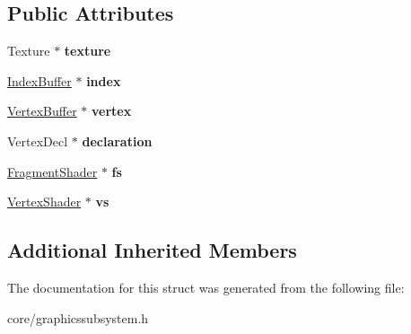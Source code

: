 \subsection*{Public Attributes}
\begin{DoxyCompactItemize}
\item 
\hypertarget{struct_tempest_1_1_graphics_subsystem_1_1_delete_event_a129f5428efc46d3b5469d69179b6882e}{Texture $\ast$ {\bfseries texture}}\label{struct_tempest_1_1_graphics_subsystem_1_1_delete_event_a129f5428efc46d3b5469d69179b6882e}

\item 
\hypertarget{struct_tempest_1_1_graphics_subsystem_1_1_delete_event_aef96cac721851095e66af4a82283d0c2}{\hyperlink{class_tempest_1_1_index_buffer}{Index\+Buffer} $\ast$ {\bfseries index}}\label{struct_tempest_1_1_graphics_subsystem_1_1_delete_event_aef96cac721851095e66af4a82283d0c2}

\item 
\hypertarget{struct_tempest_1_1_graphics_subsystem_1_1_delete_event_a2b959758eac95621a56ff65d4296690e}{\hyperlink{class_tempest_1_1_vertex_buffer}{Vertex\+Buffer} $\ast$ {\bfseries vertex}}\label{struct_tempest_1_1_graphics_subsystem_1_1_delete_event_a2b959758eac95621a56ff65d4296690e}

\item 
\hypertarget{struct_tempest_1_1_graphics_subsystem_1_1_delete_event_ada17db211c16654d2bd921568734a4ce}{Vertex\+Decl $\ast$ {\bfseries declaration}}\label{struct_tempest_1_1_graphics_subsystem_1_1_delete_event_ada17db211c16654d2bd921568734a4ce}

\item 
\hypertarget{struct_tempest_1_1_graphics_subsystem_1_1_delete_event_a023bdfd3099e0e7870abab826fd98715}{\hyperlink{class_tempest_1_1_fragment_shader}{Fragment\+Shader} $\ast$ {\bfseries fs}}\label{struct_tempest_1_1_graphics_subsystem_1_1_delete_event_a023bdfd3099e0e7870abab826fd98715}

\item 
\hypertarget{struct_tempest_1_1_graphics_subsystem_1_1_delete_event_aac30111c059fe018b85db8b4f5405610}{\hyperlink{class_tempest_1_1_vertex_shader}{Vertex\+Shader} $\ast$ {\bfseries vs}}\label{struct_tempest_1_1_graphics_subsystem_1_1_delete_event_aac30111c059fe018b85db8b4f5405610}

\end{DoxyCompactItemize}
\subsection*{Additional Inherited Members}


The documentation for this struct was generated from the following file\+:\begin{DoxyCompactItemize}
\item 
core/graphicssubsystem.\+h\end{DoxyCompactItemize}
